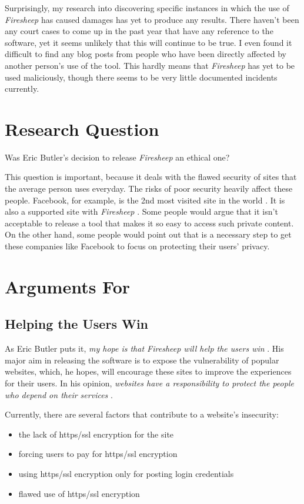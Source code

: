 \documentclass[11pt]{article}
\begin{document}
\begin{multicols}{2}
Surprisingly, my research into discovering specific instances in which the use of \emph{Firesheep} has caused damages has yet to produce any results. There haven't been any court cases to come up in the past year that have any reference to the software, yet it seems unlikely that this will continue to be true. I even found it difficult to find any blog posts from people who have been directly affected by another person's use of the tool. This hardly means that \emph{Firesheep} has yet to be used maliciously, though there seems to be very little documented incidents currently. 

\section{Research Question}
Was Eric Butler's decision to release \emph{Firesheep} an ethical one?

This question is important, because it deals with the flawed security of sites that the average person uses everyday. The risks of poor security heavily affect these people. Facebook, for example, is the 2nd most visited site in the world \cite{alexa}. It is also a supported site with \emph{Firesheep} \cite{github}. Some people would argue that it isn't acceptable to release a tool that makes it so easy to access such private content. On the other hand,  some people would point out that is a necessary step to get these companies like Facebook to focus on protecting their users' privacy.

\section{Arguments For}
\subsection{Helping the Users Win}
As Eric Butler  puts it, \emph{my hope is that Firesheep will help the users win} \cite{codebutler_main}. His major aim in releasing the software is to expose the vulnerability of popular websites, which, he hopes, will encourage these sites to improve the experiences for their users. In his opinion, \emph{websites have a responsibility to protect the people who depend on their services} \cite{codebutler_main}.

Currently, there are several factors that contribute to a website's insecurity: \cite{codebutler_blog_1}
\begin{itemize}
  \item
  the lack of https/ssl encryption for the site
  \item
  forcing users to pay for https/ssl encryption
  \item
  using https/ssl encryption only for posting login credentials
  \item
  flawed use of https/ssl encryption
\end{itemize}


\end{multicols}
\end{document}
